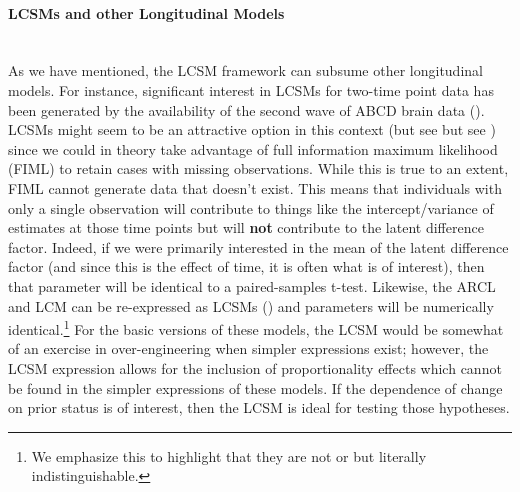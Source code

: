 \documentclass[11pt]{article}
\newcommand{\subsubsubsection}[1]{\paragraph{#1}\mbox{}\\}  %
\begin{document}
\subsubsubsection{LCSMs and other Longitudinal Models}
As we have mentioned, the LCSM framework can subsume other longitudinal models. For instance, significant interest in LCSMs for two-time point data has been generated by the availability of the second wave of ABCD brain data (\cite{henk_preliminary_2016,kievit_developmental_2018}). LCSMs might seem to be an attractive option in this context (but see but see \cite{parsons_dont_2022}) since we could in theory take advantage of full information maximum likelihood (FIML) to retain cases with missing observations. While this is true to an extent, FIML cannot generate data that doesn’t exist. This means that individuals with only a single observation will contribute to things like the intercept/variance of estimates at those time points but will \textbf{not} contribute to the latent difference factor. Indeed, if we were primarily interested in the mean of the latent difference factor (and since this is the effect of time, it is often what is of interest), then that parameter will be identical to a paired-samples t-test. Likewise, the ARCL and LCM can be re-expressed as LCSMs (\cite{grimm_recent_2012}) and parameters will be numerically identical.\footnote{We emphasize this to highlight that they are not  or  but literally indistinguishable.} For the basic versions of these models, the LCSM would be somewhat of an exercise in over-engineering when simpler expressions exist; however, the LCSM expression allows for the inclusion of proportionality effects which cannot be found in the simpler expressions of these models. If the dependence of change on prior status is of interest, then the LCSM is ideal for testing those hypotheses.
\end{document}
